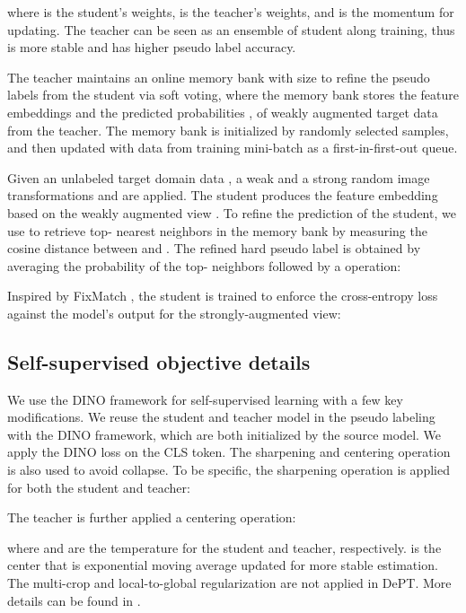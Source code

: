 \documentclass{article} \usepackage{iclr2023_conference,times}
\begin{document}
where  is the student's weights,  is the teacher's weights, and  is the momentum for updating. The teacher can be seen as an ensemble of student along training, thus is more stable and has higher pseudo label accuracy.

The teacher maintains an online memory bank  with size  to refine the pseudo labels from the student via soft voting, where the memory bank stores the feature embeddings and the predicted probabilities ,  of weakly augmented target data from the teacher. The memory bank  is initialized by randomly selected  samples, and then updated with data from training mini-batch as a first-in-first-out queue.

Given an unlabeled target domain data , a weak and a strong random image transformations  and  are applied. The student produces the feature embedding  based on the weakly augmented view . To refine the prediction of the student, we use  to retrieve top- nearest neighbors in the memory bank  by measuring the cosine distance between  and . The refined hard pseudo label is obtained by averaging the probability of the top- neighbors followed by a  operation:


Inspired by FixMatch \citep{sohn2020fixmatch}, the student is trained to enforce the cross-entropy loss against the model's output for the strongly-augmented view:




\subsection{Self-supervised objective details}\label{appendix:ss}

We use the DINO \citep{caron2021emerging} framework for self-supervised learning with a few key modifications. We reuse the student and teacher model in the pseudo labeling with the DINO framework, which are both initialized by the source model. We apply the DINO loss on the CLS token. The sharpening and centering operation is also used to avoid collapse. To be specific, the sharpening operation is applied for both the student and teacher:

The teacher is further applied a centering operation:

where  and  are the temperature for the student and teacher, respectively.  is the center that is exponential moving average updated for more stable estimation. The multi-crop and local-to-global regularization are not applied in DePT. More details can be found in \citep{caron2021emerging}.
\end{document}
